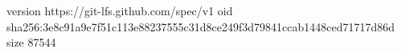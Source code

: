 version https://git-lfs.github.com/spec/v1
oid sha256:3e8c91a9e7f51c113e88237555c31d8ce249f3d79841ccab1448ced71717d86d
size 87544
